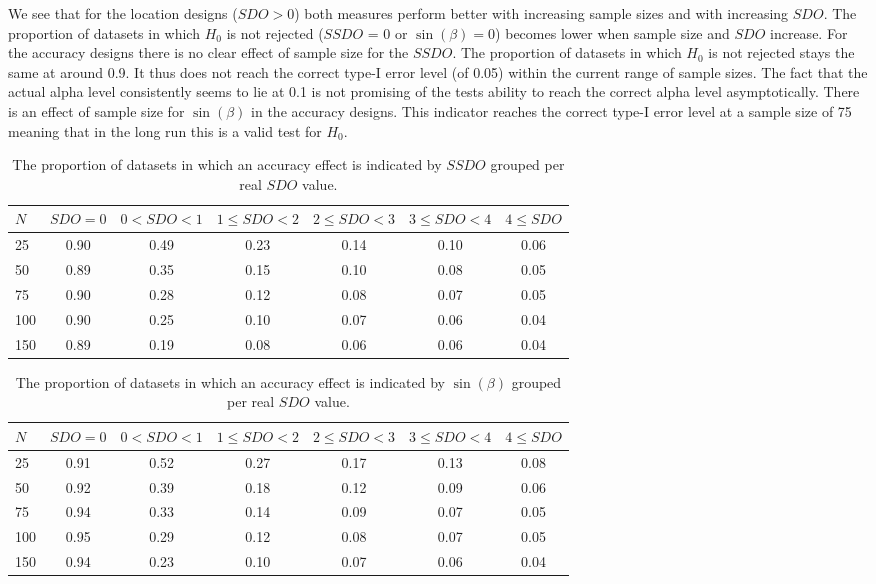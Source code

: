 \documentclass[]{interact}
\begin{document}
We see that for the location designs ($SDO > 0$) both measures perform better
with increasing sample sizes and with increasing $SDO$. The proportion of
datasets in which \textit{$H_0$} is not rejected ($SSDO$ = 0 or $\sin(\beta) =
0$) becomes lower when sample size and $SDO$ increase. For the accuracy designs
there is no clear effect of sample size for the $SSDO$. The proportion of
datasets in which \textit{$H_0$} is not rejected stays the same at around 0.9.
It thus does not reach the correct type-I error level (of 0.05) within the
current range of sample sizes. The fact that the actual alpha level consistently
seems to lie at 0.1 is not promising of the tests ability to reach the correct
alpha level asymptotically. There is an effect of sample size for $\sin(\beta)$
in the accuracy designs. This indicator reaches the correct type-I error level
at a sample size of 75 meaning that in the long run this is a valid test for
\textit{$H_0$}.

\begin{table}
\centering
\caption{The proportion of datasets in which an accuracy effect is indicated by $SSDO$ grouped per real $SDO$ value.} 
\begin{tabular}{lcccccc}
  \noalign{\smallskip}\hline\noalign{\smallskip}
$N$ & $SDO = 0$ & $ 0 < SDO < 1$ & $1 \leq SDO < 2$ & $2 \leq SDO < 3$ &  $3 \leq SDO < 4$ & $4 \leq SDO$\\ \hline\noalign{\smallskip}
25 & 0.90 & 0.49 & 0.23 & 0.14 & 0.10 & 0.06\\
50 & 0.89 & 0.35 & 0.15 & 0.10 & 0.08 & 0.05\\
75 & 0.90 & 0.28 & 0.12 & 0.08 & 0.07 & 0.05\\
100& 0.90 & 0.25 & 0.10 & 0.07 & 0.06 & 0.04\\
150& 0.89 & 0.19 & 0.08 & 0.06 & 0.06 & 0.04\\
   \hline
\end{tabular}
\label{TableResSSDO}
\end{table}

\begin{table}
\centering
\caption{The proportion of datasets in which an accuracy effect is indicated by $\sin(\beta)$ grouped per real $SDO$ value.} 
\begin{tabular}{lcccccc}
  \noalign{\smallskip}\hline\noalign{\smallskip}
$N$ & $SDO = 0$ & $ 0 < SDO < 1$ & $1 \leq SDO < 2$ & $2 \leq SDO < 3$ &  $3 \leq SDO < 4$ & $4 \leq SDO$\\ \hline\noalign{\smallskip}
25 & 0.91 & 0.52 & 0.27 & 0.17 & 0.13 & 0.08\\
50 & 0.92 & 0.39 & 0.18 & 0.12 & 0.09 & 0.06\\
75 & 0.94 & 0.33 & 0.14 & 0.09 & 0.07 & 0.05\\
100& 0.95 & 0.29 & 0.12 & 0.08 & 0.07 & 0.05\\
150& 0.94 & 0.23 & 0.10 & 0.07 & 0.06 & 0.04\\
   \hline
\end{tabular}
\label{TableResdet}
\end{table}
\end{document}
